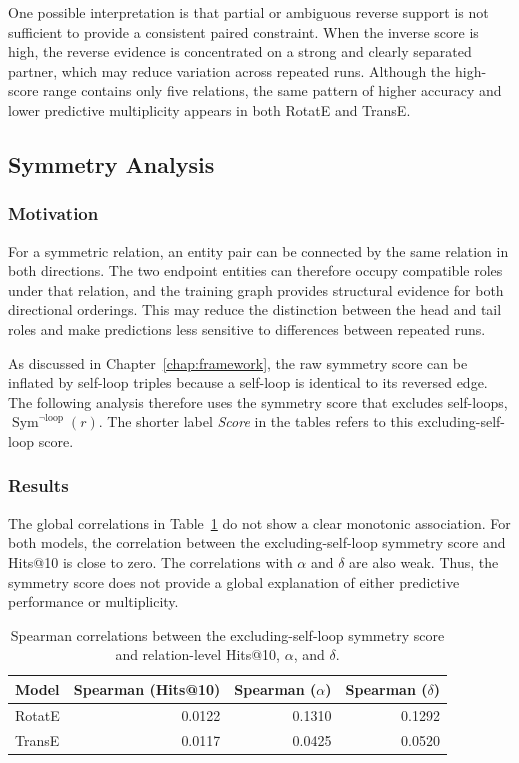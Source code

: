 One possible interpretation is that partial or ambiguous reverse support is
not sufficient to provide a consistent paired constraint. When the inverse
score is high, the reverse evidence is concentrated on a strong and clearly
separated partner, which may reduce variation across repeated runs. Although
the high-score range contains only five relations, the same pattern of higher
accuracy and lower predictive multiplicity appears in both RotatE and TransE.

\subsection{Symmetry Analysis}
\label{sec:symmetry_analysis}

\subsubsection{Motivation}

For a symmetric relation, an entity pair can be connected by the same relation
in both directions. The two endpoint entities can therefore occupy compatible
roles under that relation, and the training graph provides structural evidence
for both directional orderings. This may reduce the distinction between the
head and tail roles and make predictions less sensitive to differences between
repeated runs.

As discussed in Chapter~\ref{chap:framework}, the raw symmetry score can be
inflated by self-loop triples because a self-loop is identical to its reversed
edge. The following analysis therefore uses the symmetry score that excludes
self-loops, \(\operatorname{Sym}^{\neg\mathrm{loop}}(r)\). The shorter label
\emph{Score} in the tables refers to this excluding-self-loop score.

\subsubsection{Results}

The global correlations in Table~\ref{tab:symmetry-spearman} do not show a
clear monotonic association. For both models, the correlation between the
excluding-self-loop symmetry score and Hits@10 is close to zero. The
correlations with \(\alpha\) and \(\delta\) are also weak. Thus, the symmetry
score does not provide a global explanation of either predictive performance or
multiplicity.

\begin{table}[!t]
    \centering
    \caption{Spearman correlations between the excluding-self-loop symmetry
    score and relation-level Hits@10, \(\alpha\), and \(\delta\).}
    \label{tab:symmetry-spearman}
    \small
    \begin{tabular}{lrrr}
        \toprule
        Model & Spearman (Hits@10) & Spearman (\(\alpha\)) &
        Spearman (\(\delta\)) \\
        \midrule
        RotatE & 0.0122 & 0.1310 & 0.1292 \\
        TransE & 0.0117 & 0.0425 & 0.0520 \\
        \bottomrule
    \end{tabular}
\end{table}

